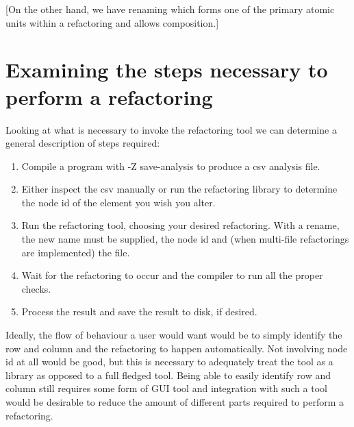 [On the other hand, we have renaming which forms one of the primary atomic units within a refactoring and allows composition.]










\section{Examining the steps necessary to perform a refactoring}

Looking at what is necessary to invoke the refactoring tool we can determine a general description of steps required:

\begin{enumerate}
\item Compile a program with -Z save-analysis to produce a csv analysis file.
\item Either inspect the csv manually or run the refactoring library to determine the node id of the element you wish you alter.
\item Run the refactoring tool, choosing your desired refactoring. With a rename, the new name must be supplied, the node id and (when multi-file refactorings are implemented) the file.
\item Wait for the refactoring to occur and the compiler to run all the proper checks. 
\item Process the result and save the result to disk, if desired.
\end{enumerate}

Ideally, the flow of behaviour a user would want would be to simply identify the row and column and the refactoring to happen automatically. Not involving node id at all would be good, but this is necessary to adequately treat the tool as a library as opposed to a full fledged tool. Being able to easily identify row and column still requires some form of GUI tool and integration with such a tool would be desirable to reduce the amount of different parts required to perform a refactoring. 

